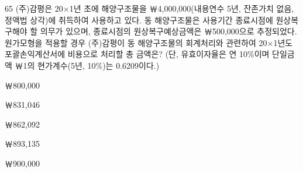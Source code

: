 \begin{question}{65}
(주)감평은 20×1년 초에 해양구조물을 ￦4,000,000(내용연수 5년, 잔존가치 없음, 정액법 상각)에 취득하여 사용하고 있다. 동 해양구조물은 사용기간 종료시점에 원상복구해야 할 의무가 있으며, 종료시점의 원상복구예상금액은 ￦500,000으로 추정되었다. 원가모형을 적용할 경우 (주)감평이 동 해양구조물의 회계처리와 관련하여 20×1년도 포괄손익계산서에 비용으로 처리할 총 금액은? (단, 유효이자율은 연 10\%이며 단일금액 ￦1의 현가계수(5년, 10\%)는 0.6209이다.)
\begin{choices}
  \item ￦800,000
  \item ￦831,046
  \item ￦862,092
  \item ￦893,135
  \item ￦900,000
\end{choices}
\end{question}
